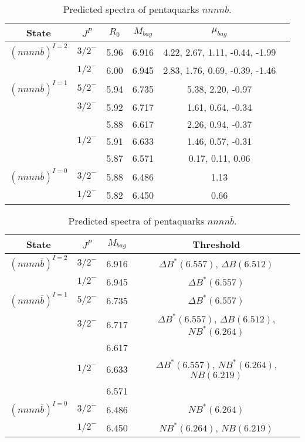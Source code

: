 \documentclass[prd,twocolumn,floatfix,nofootinbib]{revtex4}
\begin{document}
\renewcommand{\tabcolsep}{0.5cm}
\renewcommand{\arraystretch}{1.2}
\begin{table*}[!htbp]
    \caption{Predicted spectra of pentaquarks $nnnn\bar{b}$.}
    \begin{tabular}{cccccc}
        \hline\hline
        {\rm State} &$J^{P}$ &$R_{0}$ &$M_{bag}$ &$\mu_{bag}$ \\ \hline
        ${(nnnn\bar{b})}^{I=2}$
            &${3/2}^{-}$    &5.96   &6.916  &4.22, 2.67, 1.11, -0.44, -1.99  \\
            &${1/2}^{-}$    &6.00   &6.945  &2.83, 1.76, 0.69, -0.39, -1.46  \\
        ${(nnnn\bar{b})}^{I=1}$
            &${5/2}^{-}$    &5.94   &6.735  &5.38, 2.20, -0.97 \\
            &${3/2}^{-}$    &5.92   &6.717  &1.61, 0.64, -0.34 \\
            &               &5.88   &6.617  &2.26, 0.94, -0.37 \\
            &${1/2}^{-}$    &5.91   &6.633  &1.46, 0.57, -0.31 \\
            &               &5.87   &6.571  &0.17, 0.11, 0.06  \\
        ${(nnnn\bar{b})}^{I=0}$
            &${3/2}^{-}$    &5.88   &6.486  &1.13  \\
            &${1/2}^{-}$    &5.82   &6.450  &0.66  \\
        \hline\hline
    \end{tabular}
\end{table*}

\renewcommand{\tabcolsep}{0.5cm}
\renewcommand{\arraystretch}{1.2}
\begin{table*}[!htbp]
    \caption{Predicted spectra of pentaquarks $nnnn\bar{b}$.}
    \begin{tabular}{cccc}
        \hline\hline
        {\rm State} &$J^{P}$ &$M_{bag}$ &{\rm Threshold} \\ \hline
        ${(nnnn\bar{b})}^{I=2}$
            &${3/2}^{-}$    &6.916 &$\Delta B^{\ast}(6.557)$, $\Delta B(6.512)$ \\
            &${1/2}^{-}$    &6.945 &$\Delta B^{\ast}(6.557)$ \\
        ${(nnnn\bar{b})}^{I=1}$
            &${5/2}^{-}$    &6.735 &$\Delta B^{\ast}(6.557)$ \\
            &${3/2}^{-}$    &6.717 &$\Delta B^{\ast}(6.557)$, $\Delta B(6.512)$, $N B^{\ast}(6.264)$ \\
            &               &6.617 & \\
            &${1/2}^{-}$    &6.633 &$\Delta B^{\ast}(6.557)$, $N B^{\ast}(6.264)$, $N B(6.219)$ \\
            &               &6.571 & \\
        ${(nnnn\bar{b})}^{I=0}$
            &${3/2}^{-}$    &6.486 &$N B^{\ast}(6.264)$ \\
            &${1/2}^{-}$    &6.450 &$N B^{\ast}(6.264)$, $N B(6.219)$ \\
        \hline\hline
    \end{tabular}
\end{table*}
\end{document}
